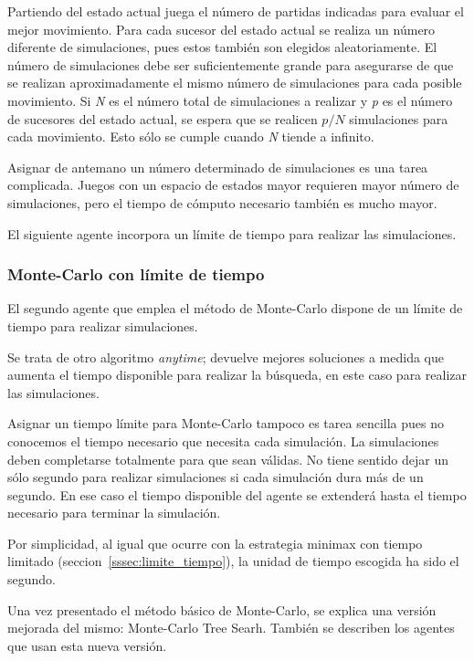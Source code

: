 Partiendo del estado actual juega el número de partidas indicadas para evaluar el mejor movimiento.
Para cada sucesor del estado actual se realiza un número diferente de simulaciones, pues estos también son elegidos aleatoriamente.
El número de simulaciones debe ser suficientemente grande para asegurarse de que se realizan aproximadamente el mismo número de simulaciones para cada posible movimiento.
Si \textit{N} es el número total de simulaciones a realizar y \textit{p} es el número de sucesores del estado actual, se espera que se realicen $p/N$ simulaciones para cada movimiento.
Esto sólo se cumple cuando \textit{N} tiende a infinito.

Asignar de antemano un número determinado de simulaciones es una tarea complicada.
Juegos con un espacio de estados mayor requieren mayor número de simulaciones, pero el tiempo de cómputo necesario también es mucho mayor.

\bigskip
El siguiente agente incorpora un límite de tiempo para realizar las simulaciones.

\subsubsection{Monte-Carlo con límite de tiempo}
\label{sssec:montecarlo_limiteTiempo}
El segundo agente que emplea el método de Monte-Carlo dispone de un límite de tiempo para realizar simulaciones.

Se trata de otro algoritmo \textit{anytime}; devuelve mejores soluciones a medida que aumenta el tiempo disponible para realizar la búsqueda, en este caso para realizar las simulaciones.

Asignar un tiempo límite para Monte-Carlo tampoco es tarea sencilla pues no conocemos el tiempo necesario que necesita cada simulación.
La simulaciones deben completarse totalmente para que sean válidas.
No tiene sentido dejar un sólo segundo para realizar simulaciones si cada simulación dura más de un segundo.
En ese caso el tiempo disponible del agente se extenderá hasta el tiempo necesario para terminar la simulación.

Por simplicidad, al igual que ocurre con la estrategia minimax con tiempo limitado (seccion~\ref{sssec:limite_tiempo}), la unidad de tiempo escogida ha sido el segundo.

\bigskip
Una vez presentado el método básico de Monte-Carlo, se explica una versión mejorada del mismo: Monte-Carlo Tree Searh.
También se describen los agentes que usan esta nueva versión.

